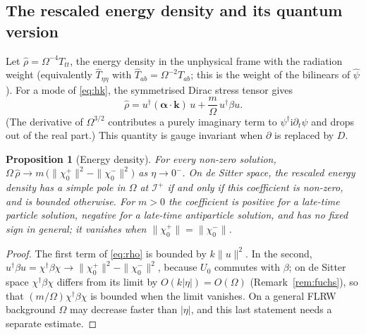 \documentclass[11pt,a4paper]{article}
\newtheorem{proposition}{Proposition}
\theoremstyle{definition}
\newcommand{\scri}{\mathscr{I}^{+}}
\newcommand{\ii}{\mathrm{i}}
\newcommand{\hpsi}{\hat\psi}
\begin{document}
\subsection{The rescaled energy density and its quantum version}
\label{sec:energy}

Let $\hat\rho=\Omega^{-4}T_{tt}$, the energy density in the unphysical frame with the radiation weight (equivalently $\hat T_{\eta\eta}$ with $\hat T_{ab}=\Omega^{-2}T_{ab}$; this is the weight of the bilinears of $\hpsi$). For a mode of \eqref{eq:hk}, the symmetrised Dirac stress tensor gives
\begin{equation}
\hat\rho=u^{\dagger}(\boldsymbol\alpha\cdot\mathbf{k})\,u+\frac{m}{\Omega}\,u^{\dagger}\beta u .
\label{eq:rho}
\end{equation}
(The derivative of $\Omega^{3/2}$ contributes a purely imaginary term to $\psi^{\dagger}\ii\partial_{t}\psi$ and drops out of the real part.) This quantity is gauge invariant when $\partial$ is replaced by $D$.

\begin{proposition}[Energy density]
\label{prop:energy}
For every non-zero solution, $\Omega\,\hat\rho\to m\,\big(\|\chi_{0}^{+}\|^{2}-\|\chi_{0}^{-}\|^{2}\big)$ as $\eta\to0^{-}$. On de Sitter space, the rescaled energy density has a simple pole in $\Omega$ at $\scri$ if and only if this coefficient is non-zero, and is bounded otherwise. For $m>0$ the coefficient is positive for a late-time particle solution, negative for a late-time antiparticle solution, and has no fixed sign in general; it vanishes when $\|\chi_{0}^{+}\|=\|\chi_{0}^{-}\|$.
\end{proposition}
\begin{proof}
The first term of \eqref{eq:rho} is bounded by $k\|u\|^{2}$. In the second, $u^{\dagger}\beta u=\chi^{\dagger}\beta\chi\to\|\chi_{0}^{+}\|^{2}-\|\chi_{0}^{-}\|^{2}$, because $U_{0}$ commutes with $\beta$; on de Sitter space $\chi^{\dagger}\beta\chi$ differs from its limit by $O(k|\eta|)=O(\Omega)$ (Remark~\ref{rem:fuchs}), so that $(m/\Omega)\chi^{\dagger}\beta\chi$ is bounded when the limit vanishes. On a general FLRW background $\Omega$ may decrease faster than $|\eta|$, and this last statement needs a separate estimate.
\end{proof}
\end{document}
